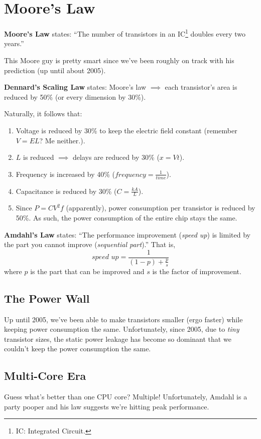 \documentclass{report}
\newcommand{\definition}[2]{\begin{tcolorbox}[title={Definition: #1}]{#2}\end{tcolorbox}}
\begin{document}
\section{Moore's Law}
\definition{Moore's Law}{
  \textbf{Moore's Law} states: ``The number of transistors in an IC\footnote{IC: Integrated
    Circuit.} doubles every two years.''
}

This Moore guy is pretty smart since we've been roughly on track with his prediction (up until about
2005).

\definition{Dennard's Scaling Law}{
  \textbf{Dennard's Scaling Law} states: Moore's law $\implies$ each transistor's area is
  reduced by 50\% (or every dimension by 30\%).
}

Naturally, it follows that:
\begin{enumerate}[label=\textit{(\roman*)}]
\item Voltage is reduced by 30\% to keep the electric field constant (remember $V = EL$? Me
  neither.).
\item $L$ is reduced $\implies$ delays are reduced by 30\% ($x = Vt$).
\item Frequency is increased by 40\% ($\textit{frequency} = \frac{1}{\textit{time}}$).
\item Capacitance is reduced by 30\% ($C = \frac{kA}{L}$).
\item Since $P = CV^2f$ (apparently), power consumption per transistor is reduced by 50\%. As such,
  the power consumption of the entire chip stays the same.
\end{enumerate}

\definition{Amdahl's Law}{
  \textbf{Amdahl's Law} states: ``The performance improvement (\textit{speed up}) is limited by the
  part you cannot improve (\textit{sequential part}).'' That is,
  \[\textit{speed up} = \frac{1}{(1 - p) + \frac{p}{s}}\]
  where $p$ is the part that can be improved and $s$ is the factor of improvement.
}

\subsection{The Power Wall}
Up until 2005, we've been able to make transistors smaller (ergo faster) while keeping power
consumption the same. Unfortunately, since 2005, due to \textit{tiny} transistor sizes, the static
power leakage has become so dominant that we couldn't keep the power consumption the same. 


\subsection{Multi-Core Era}
Guess what's better than one CPU core? Multiple! Unfortunately, Amdahl is a party pooper and his law
suggests we're hitting peak performance.
\end{document}
